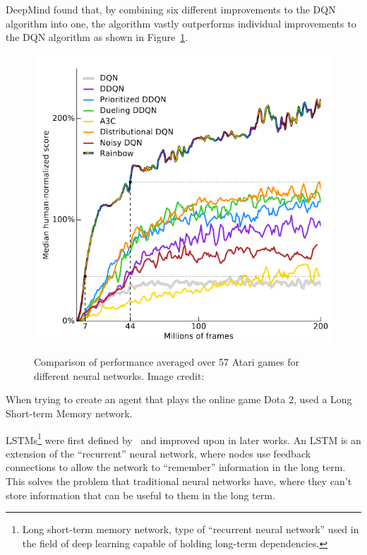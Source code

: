 \documentclass[12pt,a4paper]{article}
\begin{document}
    DeepMind found that, by combining six different improvements to the DQN algorithm into one, the algorithm vastly outperforms individual improvements to the DQN algorithm as shown in Figure~\ref{fig:neuralnetperformance}.

    \begin{figure}[ht]
        \caption[Comparison of different neural network performance.]{Comparison of performance averaged over 57 Atari games for different neural networks. Image credit: \citet{hessel17}}
        \centering
        \includegraphics[scale=0.4]{neuralnetperformance}
        \label{fig:neuralnetperformance}
    \end{figure}

    When trying to create an agent that plays the online game Dota 2, \citet{berner19} used a Long Short-term Memory network.

    LSTMs\footnote{Long short-term memory network, type of ``recurrent neural network'' used in the field of deep learning capable of holding long-term dependencies.} were first defined by~\citet{hochreiter97} and improved upon in later works.
    An LSTM is an extension of the ``recurrent'' neural network, where nodes use feedback connections to allow the network to ``remember'' information in the long term.
    This solves the problem that traditional neural networks have, where they can't store information that can be useful to them in the long term.
\end{document}
